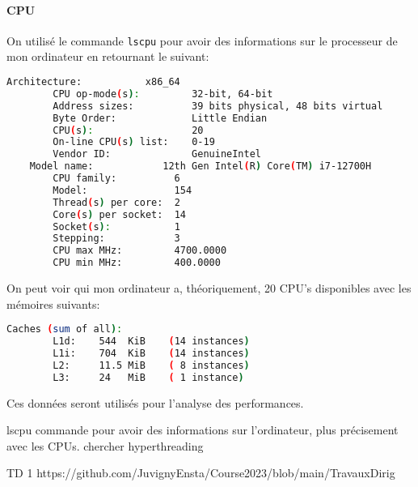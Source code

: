 \documentclass{article}
\begin{document}
\paragraph{CPU}On utilisé le commande \texttt{lscpu} pour avoir des informations sur le processeur de mon ordinateur en retournant le suivant:
\begin{scriptsize}
    \mycode
    \begin{lstlisting}[language=bash]
    Architecture:           x86_64
        CPU op-mode(s):         32-bit, 64-bit
        Address sizes:          39 bits physical, 48 bits virtual
        Byte Order:             Little Endian
        CPU(s):                 20
        On-line CPU(s) list:    0-19
        Vendor ID:              GenuineIntel
    Model name:            12th Gen Intel(R) Core(TM) i7-12700H
        CPU family:          6
        Model:               154
        Thread(s) per core:  2
        Core(s) per socket:  14
        Socket(s):           1
        Stepping:            3
        CPU max MHz:         4700.0000
        CPU min MHz:         400.0000
    \end{lstlisting}
\end{scriptsize}
On peut voir qui mon ordinateur a, théoriquement, 20 CPU's disponibles avec les mémoires suivants:
\begin{scriptsize}
    \mycode
    \begin{lstlisting}[language=bash]
    Caches (sum of all):     
        L1d:    544  KiB    (14 instances)
        L1i:    704  KiB    (14 instances)
        L2:     11.5 MiB    ( 8 instances)
        L3:     24   MiB    ( 1 instance)
    \end{lstlisting}
\end{scriptsize}
Ces données seront utilisés pour l'analyse des performances. 




lscpu commande pour avoir des informations sur l'ordinateur, plus précisement avec les CPUs.
chercher hyperthreading

TD 1
https://github.com/JuvignyEnsta/Course2023/blob/main/TravauxDirig%
\end{document}
